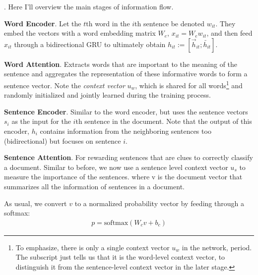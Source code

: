 \documentclass[11pt]{article}
\begin{document}
\myspace
\p {}. Here I'll overview the main stages of information flow.
\begin{compactenum}
	\item \textbf{Word Encoder}. Let the $t$th word in the $i$th sentence be denoted $w_{it}$. They embed the vectors with a word embedding matrix $W_e$, $x_{it} = W_e w_{it}$, and then feed $x_{it}$ through a bidirectional GRU to ultimately obtain $h_{it} := [\overrightarrow h_{it}; \overleftarrow{h_{it}}]$.
	
	\item \textbf{Word Attention}. Extracts words that are important to the meaning of the sentence and aggregates the representation of these informative words to form a sentence vector. 
	Note the \textit{context vector} $u_w$, which is shared for all words\footnote{To emphasize, there is only a single context vector $u_w$ in the network, period. The subscript just tells us that it is the word-level context vector, to distinguish it from the sentence-level context vector in the later stage.} and randomly initialized and jointly learned during the training process. 
	
	\item \textbf{Sentence Encoder}. Similar to the word encoder, but uses the sentence vectors $s_i$ as the input for the $i$th sentence in the document. Note that the output of this encoder, $h_i$ contains information from the neighboring sentences too (bidirectional) but focuses on sentence $i$. 
	
	\item \textbf{Sentence Attention}. For rewarding sentences that are clues to correctly classify a document. Similar to before, we now use a sentence level context vector $u_s$ to measure the importance of the sentences.
	where v is the document vector that summarizes all the information of sentences in a document.
\end{compactenum}

As usual, we convert $v$ to a normalized probability vector by feeding through a softmax:
\begin{align}
p = \text{softmax}(W_c v + b_c)
\end{align}
\end{document}
